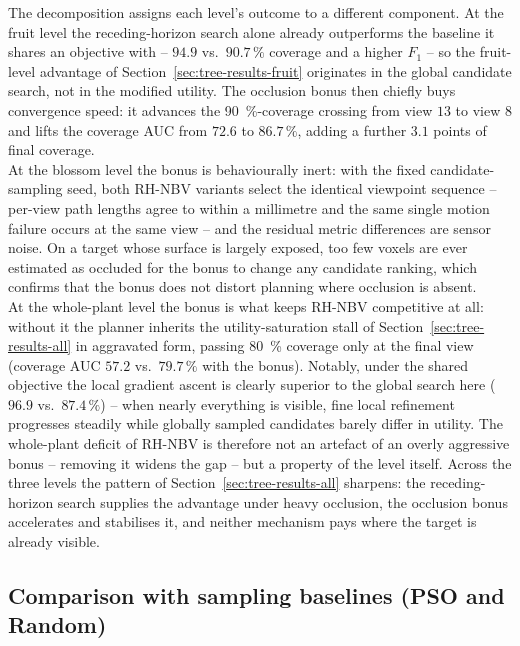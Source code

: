 The decomposition assigns each level's outcome to a different component. At
the fruit level the receding-horizon search alone already outperforms the
baseline it shares an objective with -- $94.9$ vs.\ $90.7\,\%$ coverage and
a higher $F_1$ -- so the fruit-level advantage of
Section~\ref{sec:tree-results-fruit} originates in the global candidate
search, not in the modified utility. The occlusion bonus then chiefly buys
convergence speed: it advances the \SI{90}{\percent}-coverage crossing from
view $13$ to view $8$ and lifts the coverage AUC from $72.6$ to $86.7\,\%$,
adding a further $3.1$ points of final coverage.\\

At the blossom level the bonus is behaviourally inert: with the fixed
candidate-sampling seed, both RH-NBV variants select the identical viewpoint
sequence -- per-view path lengths agree to within a millimetre and the same
single motion failure occurs at the same view -- and the residual metric
differences are sensor noise. On a target whose surface is largely exposed,
too few voxels are ever estimated as occluded for the bonus to change any
candidate ranking, which confirms that the bonus does not distort planning
where occlusion is absent.\\

At the whole-plant level the bonus is what keeps RH-NBV competitive at all:
without it the planner inherits the utility-saturation stall of
Section~\ref{sec:tree-results-all} in aggravated form, passing
\SI{80}{\percent} coverage only at the final view (coverage AUC $57.2$ vs.\
$79.7\,\%$ with the bonus). Notably, under the shared objective the local
gradient ascent is clearly superior to the global search here
($96.9$ vs.\ $87.4\,\%$) -- when nearly everything is visible, fine local
refinement progresses steadily while globally sampled candidates barely
differ in utility. The whole-plant deficit of RH-NBV is therefore not an
artefact of an overly aggressive bonus -- removing it widens the gap --
but a property of the level itself. Across the three levels the pattern of
Section~\ref{sec:tree-results-all} sharpens: the receding-horizon search
supplies the advantage under heavy occlusion, the occlusion bonus
accelerates and stabilises it, and neither mechanism pays where the target
is already visible.

\subsection{Comparison with sampling baselines (PSO and Random)}
\label{sec:tree-results-baselines}

